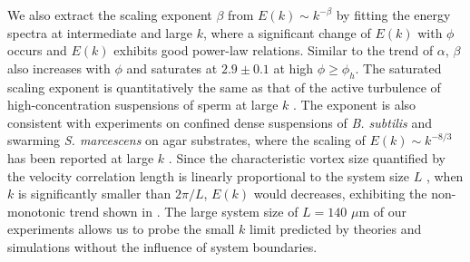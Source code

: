 \documentclass[twocolumn,aps,prl,amsmath,amssymb,longbibliography]{revtex4-2}
\begin{document}
We also extract the scaling exponent $\beta$ from $E(k) \sim k^{-\beta}$ by fitting the energy spectra at intermediate and large $k$, where a significant change of $E(k)$ with $\phi$ occurs and $E(k)$ exhibits good power-law relations.
Similar to the trend of $\alpha$, $\beta$ also increases with $\phi$ and saturates at $2.9 \pm 0.1$ at high $\phi \geq \phi_h$. The saturated scaling exponent is quantitatively the same as that of the active turbulence of high-concentration suspensions of sperm at large $k$ \cite{Creppy2015}.
The exponent is also consistent with experiments on confined dense suspensions of \textit{B. subtilis} and swarming \textit{S. marcescens} on agar substrates, where the scaling of $E(k) \sim k^{-8/3}$ has been reported at large $k$ \cite{Wensink2012,Patteson2018}. Since the characteristic vortex size quantified by the velocity correlation length is linearly proportional to the system size $L$ \cite{Guo2018}, when $k$ is significantly smaller than $2\pi/L$, $E(k)$ would decreases, exhibiting the non-monotonic trend shown in \cite{Wensink2012,Patteson2018}. The large system size of $L = 140$ $\mu$m of our experiments allows us to probe the small $k$ limit predicted by theories and simulations without the influence of system boundaries.
\end{document}

